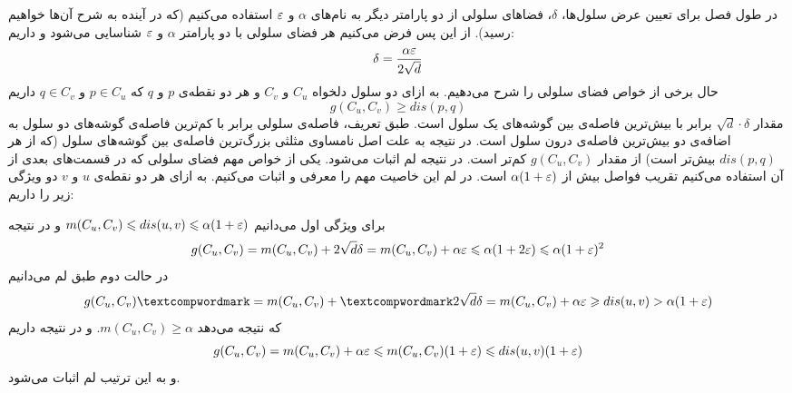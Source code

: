 در طول فصل برای تعیین عرض سلول‌ها، $\delta$، فضاهای سلولی از دو پارامتر دیگر به نام‌های $\alpha$ و $\varepsilon$ استفاده می‌کنیم (که در آینده به شرح آن‌ها خواهیم رسید). از این پس فرض می‌کنیم هر فضای سلولی با دو پارامتر $\alpha$ و $\varepsilon$ شناسایی می‌شود و داریم:
$$\delta = \frac{\alpha \varepsilon}{2 \sqrt{d}}$$
حال برخی از خواص فضای سلولی را شرح می‌دهیم.
به ازای دو سلول دلخواه $C_u$ و  $C_v$ و هر دو نقطه‌ی $p$ و $q$ که 
$p \in C_u$  و $q \in C_v$
داریم
$$ g(C_u, C_v) \ge dis(p, q)$$
مقدار $\sqrt{d} \cdot \delta $ برابر با بیش‌ترین فاصله‌ی بین گوشه‌های یک سلول است. طبق تعریف، فاصله‌ی سلولی برابر با کم‌ترین فاصله‌ی گوشه‌های دو سلول‌ به اضافه‌ی دو بیش‌ترین فاصله‌ی درون سلول است. در نتیجه به علت اصل نامساوی مثلثی بزرگ‌ترین فاصله‌ی بین گوشه‌های سلول (که از هر $dis(p,q)$ بیش‌تر است) از مقدار $g(C_u, C_v)$ کم‌تر است. در نتیجه لم اثبات می‌شود.
یکی از خواص مهم فضای سلولی که در قسمت‌های بعدی از آن استفاده می‌کنیم تقریب فواصل بیش از $\alpha (1 + \varepsilon)$ است. در لم  این خاصیت مهم را معرفی و اثبات می‌کنیم.
به ازای هر دو نقطه‌ی $u$ و $v$ دو ویژگی زیر را داریم:

برای ویژگی اول می‌دانیم
$ m( C_u, C_v) \leqslant dis(u,v) \leqslant \alpha (1+\varepsilon)$
و در نتیجه
$$ g(C_u, C_v) = m(C_u, C_v) + 2 \sqrt{d} \delta = m(C_u, C_v) + \alpha \varepsilon \leqslant \alpha (1+ 2 \varepsilon) \leqslant \alpha (1 + \varepsilon)^2$$
در حالت دوم طبق لم  می‌دانیم
$$ g(C_u, C_v)‌ = m(C_u, C_v) +‌ 2\sqrt{d} \delta = m(C_u, C_v) + \alpha \eps  \ge dis(u, v) > \alpha (1 + \eps)$$
که نتیجه می‌دهد
$ m(C_u, C_v) \ge \alpha $.
و در نتیجه داریم 
$$ g(C_u, C_v) = m(C_u, C_v) + \alpha \varepsilon \leqslant m(C_u, C_v) (1+\varepsilon) \leqslant dis(u, v) (1 + \varepsilon)$$
و به این ترتیب لم اثبات می‌شود.

